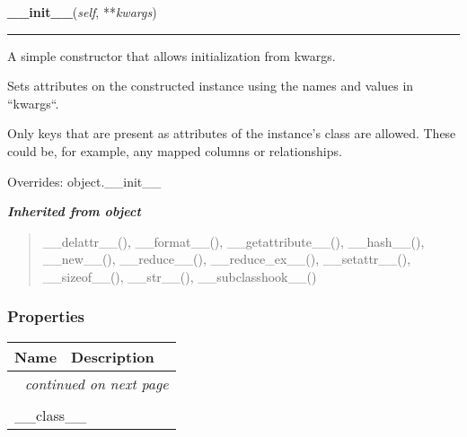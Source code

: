     \vspace{0.5ex}

\hspace{.8\funcindent}\begin{boxedminipage}{\funcwidth}

    \raggedright \textbf{\_\_init\_\_}(\textit{self}, **\textit{kwargs})

    \vspace{-1.5ex}

    \rule{\textwidth}{0.5\fboxrule}
\setlength{\parskip}{2ex}
    A simple constructor that allows initialization from kwargs.

    Sets attributes on the constructed instance using the names and values 
    in ``kwargs``.

    Only keys that are present as attributes of the instance's class are 
    allowed. These could be, for example, any mapped columns or 
    relationships.

\setlength{\parskip}{1ex}
      Overrides: object.\_\_init\_\_

    \end{boxedminipage}


\large{\textbf{\textit{Inherited from object}}}

\begin{quote}
\_\_delattr\_\_(), \_\_format\_\_(), \_\_getattribute\_\_(), \_\_hash\_\_(), \_\_new\_\_(), \_\_reduce\_\_(), \_\_reduce\_ex\_\_(), \_\_setattr\_\_(), \_\_sizeof\_\_(), \_\_str\_\_(), \_\_subclasshook\_\_()
\end{quote}


  \subsubsection{Properties}

    \vspace{-1cm}
\hspace{\varindent}\begin{longtable}{|p{\varnamewidth}|p{\vardescrwidth}|l}
\cline{1-2}
\cline{1-2} \centering \textbf{Name} & \centering \textbf{Description}& \\
\cline{1-2}
\endhead\cline{1-2}\multicolumn{3}{r}{\small\textit{continued on next page}}\\\endfoot\cline{1-2}
\endlastfoot\multicolumn{2}{|l|}{\textit{Inherited from object}}\\
\multicolumn{2}{|p{\varwidth}|}{\raggedright \_\_class\_\_}\\
\cline{1-2}
\end{longtable}


